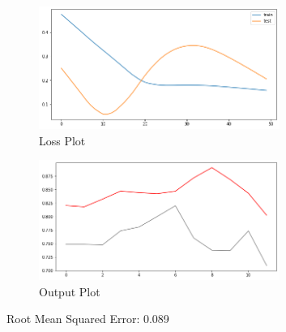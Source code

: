 \begin{figure}[H]
    \centering
    \includegraphics[width=0.7\textwidth]{Images/LSTM_L.png}
    \caption{Loss Plot}
    \label{fig1}
\end{figure}

\begin{figure}[H]
    \centering
    \includegraphics[width=0.7\textwidth]{Images/LSTM_P.png}
    \caption{Output Plot}
    \label{fig1}
\end{figure}

Root Mean Squared Error: 0.089



